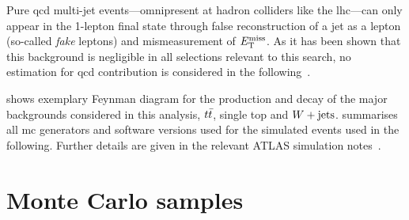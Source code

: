 Pure \gls{qcd} multi-jet events---omnipresent at hadron colliders like the \gls{lhc}---can only appear in the 1-lepton final state through false reconstruction of a jet as a lepton (so-called \textit{fake} leptons) and mismeasurement of $E_{\textrm{T}}^{\textrm{miss}}$. As it has been shown that this background is negligible in all selections relevant to this search, no estimation for \gls{qcd} contribution is considered in the following~\cite{SUSY-2019-08}.

 shows exemplary Feynman diagram for the production and decay of the major backgrounds considered in this analysis, $t\bar{t}$, single top and $W+\mathrm{jets}$.  summarises all \gls{mc} generators and software versions used for the simulated events used in the following. Further details are given in the relevant ATLAS simulation notes~\cite{ATL-PHYS-PUB-2018-009,ATL-PHYS-PUB-2016-005,ATL-PHYS-PUB-2017-006,ATL-PHYS-PUB-2017-005,ATL-PHYS-PUB-2016-002}.

\section{Monte Carlo samples}

